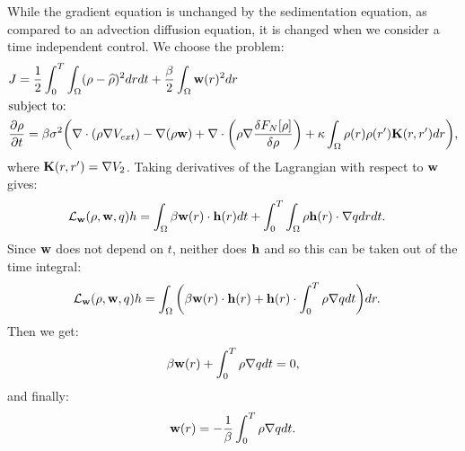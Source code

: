  \label{sec:TimeIndependentControl}
While the gradient equation is unchanged by the sedimentation equation, as compared to an advection diffusion equation, it is changed when we consider a time independent control.
We choose the problem:
\begin{align*}
	&J = \frac{1}{2}\int_0^T \int_\Omega (\rho - \widehat \rho)^2 dr dt + \frac{\beta}{2} \int_\Omega \mathbf{w}(r)^2 dr\\
	&\text{subject to:}\\
	&\frac{\partial \rho}{\partial t} = \beta \sigma^2 \bigg( \nabla \cdot (\rho \nabla V_{ext}) - \nabla (\rho \mathbf{w}) + \nabla \cdot \left(\rho \nabla \frac{\delta F_{N}[\rho]}{\delta \rho}\right) + \kappa \int_\Omega \rho(r) \rho(r') \mathbf{K}(r,r')dr\bigg),
\end{align*}
where $\mathbf{K}(r,r') = \nabla V_2$.
Taking derivatives of the Lagrangian with respect to $\mathbf{w}$ gives:
\begin{align}\label{eqn:LwGradientEqn}
	\mathcal{L}_{\mathbf{w}}(\rho,\mathbf{w}, q)h &= \int_\Omega \beta \mathbf{w}(r) \cdot \mathbf{h}(r) dt + \int_0^T \int_\Omega \rho \mathbf{h}(r) \cdot \nabla q dr dt.
\end{align}
Since $\mathbf{w}$ does not depend on $t$, neither does $\mathbf{h}$ and so this can be taken out of the time integral:
\begin{align*}
	\mathcal{L}_{\mathbf{w}}(\rho,\mathbf{w}, q)h &= \int_\Omega \bigg( \beta \mathbf{w}(r) \cdot \mathbf{h}(r)  + \mathbf{h}(r) \cdot \int_0^T \rho  \nabla q dt \bigg) dr.
\end{align*}
Then we get:
\begin{align*}
	\beta \mathbf{w}(r)  +  \int_0^T \rho  \nabla q dt = 0,
\end{align*}
and finally:
\begin{align*}
	\mathbf{w}(r) = - \frac{1}{\beta} \int_0^T \rho  \nabla q dt.
\end{align*}